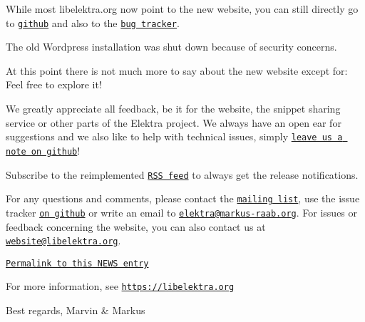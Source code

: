 While most {\ttfamily libelektra.\+org} now point to the new website, you can still directly go to \href{https://git.libelektra.org}{\tt github} and also to the \href{https://bugs.libelektra.org}{\tt bug tracker}.

The old Wordpress installation was shut down because of security concerns.

At this point there is not much more to say about the new website except for\+: Feel free to explore it!

We greatly appreciate all feedback, be it for the website, the snippet sharing service or other parts of the Elektra project. We always have an open ear for suggestions and we also like to help with technical issues, simply \href{https://bugs.libelektra.org}{\tt leave us a note on github}!

Subscribe to the reimplemented \href{https://www.libelektra.org/news/feed.rss}{\tt R\+SS feed} to always get the release notifications.

For any questions and comments, please contact the \href{https://lists.sourceforge.net/lists/listinfo/registry-list}{\tt mailing list}, use the issue tracker \href{https://bugs.libelektra.org}{\tt on github} or write an email to \href{mailto:elektra@markus-raab.org}{\tt elektra@markus-\/raab.\+org}. For issues or feedback concerning the website, you can also contact us at \href{mailto:website@libelektra.org}{\tt website@libelektra.\+org}.

\href{https://www.libelektra.org/news/website-release}{\tt Permalink to this N\+E\+WS entry}

For more information, see \href{https://libelektra.org}{\tt https\+://libelektra.\+org}

Best regards, Marvin \& Markus 